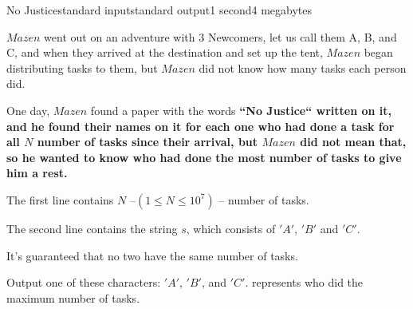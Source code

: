 \begin{problem}{No Justice}{standard input}{standard output}{1 second}{4 megabytes}

$Mazen$ went out on an adventure with $3$ Newcomers, let us call them A, B, and C, and when they arrived at the destination and set up the tent, $Mazen$ began distributing tasks to them, but $Mazen$ did not know how many tasks each person did. 

One day, $Mazen$ found a paper with the words \bf{``No Justice``} written on it, and he found their names on it for each one who had done a task for all $N$ number of tasks since their arrival, but $Mazen$ did not mean that, so he wanted to know who had done the most number of tasks to give him a rest.

\InputFile
The first line contains $N$ --$(1 \le N \le 10^7) $ -- number of tasks.

The second line contains the string $s$, which consists of $'A'$, $'B'$ and $'C'$.

It's guaranteed that no two have the same number of tasks.

\OutputFile
Output one of these characters: $'A'$, $'B'$, and $'C'$. 
represents who did the maximum number of tasks.

\Example

\begin{example}
%
\end{example}

\end{problem}

